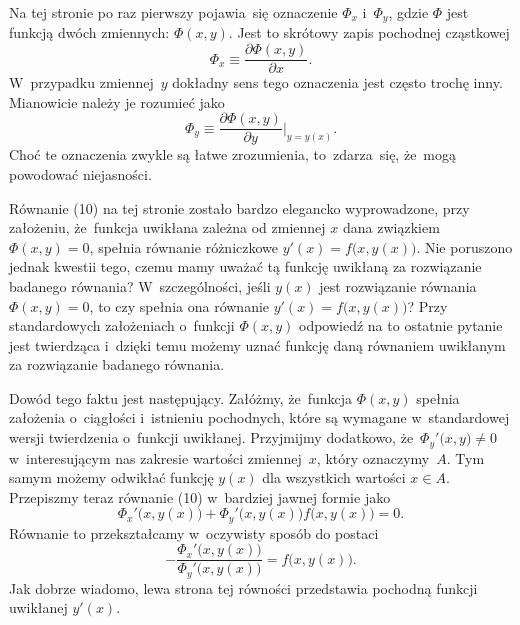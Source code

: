 \documentclass[a4paper,11pt]{article}
\numberwithin{equation}{section}
\begin{document}
\noindent
{} Na tej stronie po raz pierwszy pojawia~się oznaczenie $\Phi_{ x }$
i~$\Phi_{ y }$, gdzie $\Phi$ jest funkcją dwóch zmiennych:
$\Phi( x, y )$. Jest to skrótowy zapis pochodnej cząstkowej
\begin{equation}
  \label{eq:Uwagi-do-konkrentych-stron-10}
  \Phi_{ x } \equiv
  \frac{ \partial \Phi( x, y ) }{ \partial x }.
\end{equation}
W~przypadku zmiennej~$y$ dokładny sens tego oznaczenia jest często trochę
inny. Mianowicie należy je rozumieć jako
\begin{equation}
  \label{eq:Uwagi-do-konkrentych-stron-11}
  \Phi_{ y } \equiv
  \frac{ \partial \Phi( x, y ) }{ \partial y }\bigg|_{ y = y( x ) }.
\end{equation}
Choć te oznaczenia zwykle są łatwe zrozumienia, to~zdarza~się,
że~mogą powodować niejasności.

\VerSpaceFour





\noindent
{} Równanie (10) na tej stronie zostało bardzo elegancko wyprowadzone,
przy założeniu, że~funkcja uwikłana zależna od zmiennej $x$ dana związkiem
$\Phi( x, y ) = 0$, spełnia równanie różniczkowe
$y'( x ) = f\big( x, y( x ) \big)$. Nie poruszono jednak kwestii tego, czemu
mamy uważać tą funkcję uwikłaną za rozwiązanie badanego równania?
W~szczególności, jeśli $y( x )$ jest rozwiązanie równania $\Phi( x, y ) = 0$,
to czy spełnia ona równanie $y'( x ) = f\big( x, y( x ) \big)$?
Przy standardowych założeniach o~funkcji $\Phi( x, y )$ odpowiedź na to
ostatnie pytanie jest twierdząca i~dzięki temu możemy uznać funkcję daną
równaniem uwikłanym za rozwiązanie badanego równania.

Dowód tego faktu jest następujący. Załóżmy, że~funkcja $\Phi( x, y )$ spełnia
założenia o~ciągłości i~istnieniu pochodnych, które są wymagane
w~standardowej wersji twierdzenia o~funkcji uwikłanej. Przyjmijmy dodatkowo,
że~$\Phi_{ y }'\big( x, y \big) \neq 0$ w~interesującym nas zakresie wartości
zmiennej~$x$, który oznaczymy~$A$. Tym samym możemy odwikłać funkcję
$y( x )$ dla wszystkich wartości $x \in A$. Przepiszmy teraz równanie (10)
w~bardziej jawnej formie jako
\begin{equation}
  \label{eq:Uwagi-do-konkrentych-stron-12}
  \Phi_{ x }'\big( x, y( x ) \big) +
  \Phi_{ y }'\big( x, y( x ) \big) f\big( x, y( x ) \big) = 0.
\end{equation}
Równanie to przekształcamy w~oczywisty sposób do postaci
\begin{equation}
  \label{eq:Uwagi-do-konkrentych-stron-13}
  -\frac{ \Phi_{ x }'\big( x, y( x ) \big) }
  { \Phi_{ y }'\big( x, y( x ) \big) } =
  f\big( x, y( x ) \big).
\end{equation}
Jak dobrze wiadomo, lewa strona tej równości przedstawia pochodną funkcji
uwikłanej $y'( x )$.
\end{document}
